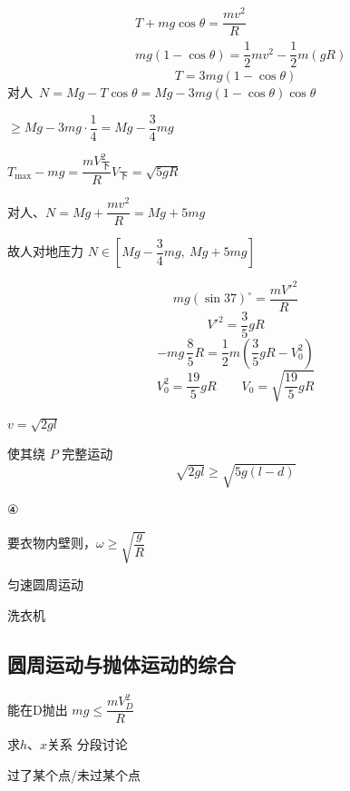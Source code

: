 \begin{problem}[例]
\begin{solution}
\begin{align*}
&T+mg\cos\theta=\dfrac{mv^2}{R}\\
&mg(1-\cos\theta)=\dfrac12mv^2-\dfrac12m(gR)
\end{align*}
\[ T=3mg(1-\cos\theta) \]
对人\ $N=Mg-T\cos\theta=Mg-3mg(1-\cos\theta)\cos\theta$

$\ge Mg-3mg\cdot\dfrac14=Mg-\dfrac34mg$

$T_{\max}-mg=\dfrac{mV_{\text{下}}^2}{R}$\qquad $V_{\text{下}}=\sqrt{5gR}$

对人、$N=Mg+\dfrac{mv^2}{R}=Mg+5mg$

故人对地压力 $N\in\left[Mg-\dfrac34mg,\ Mg+5mg\right]$
\end{solution}
\end{problem}

\[
mg(\sin37)^\circ=\frac{mV'^2}{R}
\]
\[
V'^2=\frac35gR
\]
\[
-mg\,\frac85R=\frac12m\left(\frac35gR-V_0^2\right)
\]
\[
V_0^2=\frac{19}{5}gR\qquad V_0=\sqrt{\frac{19}{5}gR}
\]

$v=\sqrt{2gl}$

使其绕 $P$ 完整运动
\[
\sqrt{2gl}\ge\sqrt{5g(l-d)}
\]

④

要衣物内壁则，$\omega\ge\sqrt{\dfrac{g}{R}}$

匀速圆周运动

洗衣机

\subsection{圆周运动与抛体运动的综合}

能在D抛出 \quad $mg\le\dfrac{mV_D^{2}}{R}$

求$h$、$x$关系 分段讨论

过了某个点/未过某个点

